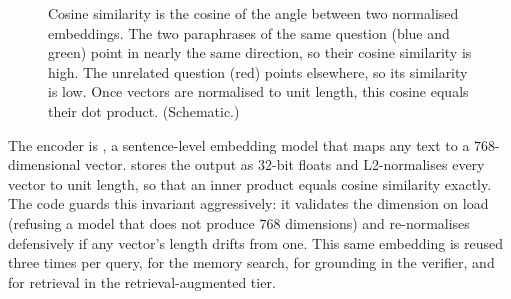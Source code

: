\begin{figure}[htbp]
\centering
{}
\caption[Cosine similarity as geometry]{Cosine similarity is the cosine of the
angle between two normalised embeddings. The two paraphrases of the same question
(blue and green) point in nearly the same direction, so their cosine similarity is
high. The unrelated question (red) points elsewhere, so its similarity is low.
Once vectors are normalised to unit length, this cosine equals their dot product. (Schematic.)}
\label{fig:cosine}
\end{figure}

\begin{fromcode}
The encoder is , a sentence-level
embedding model that maps any text to a $768$-dimensional vector. \caem{} stores
the output as $32$-bit floats and L2-normalises every vector to unit length, so
that an inner product equals cosine similarity exactly. The code guards this
invariant aggressively: it validates the dimension on load (refusing a model that
does not produce $768$ dimensions) and re-normalises defensively if any vector's
length drifts from one. This same embedding is reused three times per query, for
the memory search, for grounding in the verifier, and for retrieval in the
retrieval-augmented tier.
\end{fromcode}


